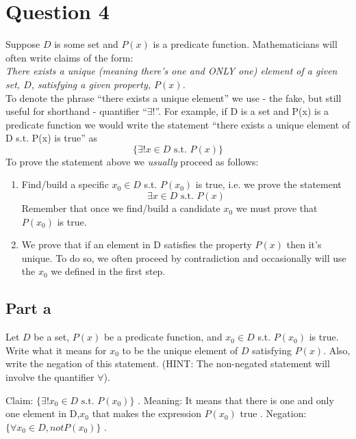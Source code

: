 \documentclass[12pt]{article}
\begin{document}
\newpage
\section*{Question 4}

Suppose $D$ is some set and $P(x)$ is a predicate function. Mathematicians will often write claims of the form:\\

{\it\noindent There exists a unique (meaning there's one and ONLY one) element of a given set, $D$, satisfying a given property, $P(x)$.}\\

\noindent To denote the phrase ``there exists a unique element'' we use - the fake, but still useful for shorthand - quantifier ``$\exists !$''. For example, if D is a set and P(x) is a predicate function we would write the statement ``there exists a unique element of D s.t. P(x) is true'' as
\[
\{\exists ! x\in D\text{ s.t. }P(x)\}
\]
To prove the statement above we {\it usually} proceed as follows:
\begin{enumerate}
  \item Find/build a specific $x_{0}\in D$ s.t. $P(x_{0})$ is true, i.e. we prove the statement
    \[
    \exists x\in D\text{ s.t. }P(x)
    \]
    Remember that once we find/build a candidate $x_{0}$ we must prove that $P(x_{0})$ is true.
    \item We prove that if an element in D satisfies the property $P(x)$ then it's unique. To do so, we often proceed by contradiction and occasionally will use the $x_{0}$ we defined in the first step.
\end{enumerate}
\subsection*{Part a}
Let $D$ be a set, $P(x)$ be a predicate function, and $x_{0}\in D$ s.t. $P(x_{0})$ is true. Write what it means for $x_{0}$ to be the unique element of $D$ satisfying $P(x)$. Also, write the negation of this statement. (HINT: The non-negated statement will involve the quantifier $\forall$).\newline

{\noindent
Claim: $\{\exists ! x_{0}\in D\text{ s.t. }P(x_{0})\}$\newline
. \newline
Meaning: It means that there is one and only one element in D,$x_{0}$ that makes the expression $P(x_{0})$ true\newline
. \newline
Negation: $\{\forall  x_{0}\in D,not P(x_{0})\}$\newline
. \newline
}
\end{document}
